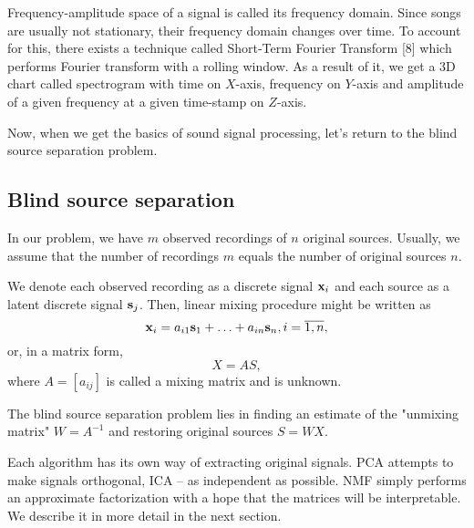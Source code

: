 \documentclass[../main.tex]{subfiles} %
\begin{document}
Frequency-amplitude space of a signal is called its frequency domain.
Since songs are usually not stationary, their frequency domain changes over time. 
To account for this, there exists a technique called Short-Term Fourier Transform [8] which performs Fourier transform with a rolling window. 
As a result of it, we get a 3D chart called spectrogram with time on $X$-axis, frequency on $Y$-axis and amplitude of a given frequency at a given time-stamp on $Z$-axis.

Now, when we get the basics of sound signal processing, let's return to the blind source separation problem.

\subsection{Blind source separation}

In our problem, we have $m$ observed recordings of $n$ original sources. Usually, we assume that the number of recordings $m$ equals the number of original sources $n$.

We denote each observed recording as a discrete signal ${\mathbf x}_i$ and each source as a latent discrete signal ${\mathbf s}_j$. Then, linear mixing procedure might be written as 
\[ {\mathbf x}_i = a_{i1} {\mathbf s}_1 + \ldots + a_{in} {\mathbf s}_n, i = \overline{1, n}, \]
or, in a matrix form, 
\[ X = A S, \]
where $A = \left[a_{ij} \right]$ is called a mixing matrix and is unknown. 

The blind source separation problem lies in finding an estimate of the "unmixing matrix" $W = A^{-1}$  and restoring original sources $S = W X$. 

Each algorithm has its own way of extracting original signals. PCA attempts to make signals orthogonal, ICA -- as independent as possible. NMF simply performs an approximate factorization with a hope that the matrices will be interpretable. We describe it in more detail in the next section.
\end{document}
